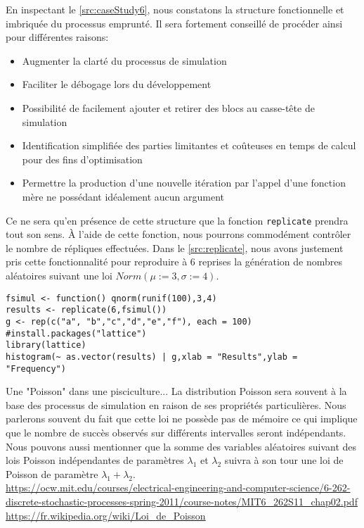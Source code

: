 En inspectant le \autoref{src:caseStudy6}, nous constatons la structure fonctionnelle et imbriquée du processus emprunté. Il sera fortement conseillé de procéder ainsi pour différentes raisons:

\begin{itemize}
	\item Augmenter la clarté du processus de simulation
	\item Faciliter le débogage lors du développement
	\item Possibilité de facilement ajouter et retirer des blocs au casse-tête de simulation
	\item Identification simplifiée des parties limitantes et coûteuses en temps de calcul pour des fins d'optimisation
	\item Permettre la production d'une nouvelle itération par l'appel d'une fonction mère ne possédant idéalement aucun argument
\end{itemize}

Ce ne sera qu'en présence de cette structure que la fonction \texttt{replicate} prendra tout son sens. À l'aide de cette fonction, nous pourrons commodément contrôler le nombre de répliques effectuées. Dans le \autoref{src:replicate}, nous avons justement pris cette fonctionnalité pour reproduire à 6 reprises la génération de nombres aléatoires suivant une loi $Norm(\mu := 3, \sigma := 4)$.

\begin{lstlisting}[caption = Replication d'une analyse par simulation,label=src:replicate]
fsimul <- function() qnorm(runif(100),3,4)
results <- replicate(6,fsimul())
g <- rep(c("a", "b","c","d","e","f"), each = 100)
#install.packages("lattice")
library(lattice)
histogram(~ as.vector(results) | g,xlab = "Results",ylab = "Frequency") 
\end{lstlisting}


\begin{moreInfo}{Une "Poisson" dans une pisciculture...}
	La distribution Poisson sera souvent à la base des processus de simulation en raison de ses propriétés particulières. Nous parlerons souvent du fait que cette loi ne possède pas de mémoire ce qui implique que le nombre de succès observés sur différents intervalles seront indépendants. Nous pouvons aussi mentionner que la somme des variables aléatoires suivant des lois Poisson indépendantes de paramètres $\lambda_1$ et $\lambda_2$ suivra à son tour une loi de Poisson de paramètre $\lambda_1 + \lambda_2$. \\
	\url{https://ocw.mit.edu/courses/electrical-engineering-and-computer-science/6-262-discrete-stochastic-processes-spring-2011/course-notes/MIT6_262S11_chap02.pdf} \\
	\url{https://fr.wikipedia.org/wiki/Loi_de_Poisson}
\end{moreInfo}

